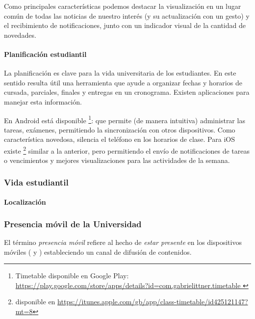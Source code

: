 Como principales características podemos destacar la visualización en un lugar común de todas las noticias de nuestro interés (y su actualización con un gesto) y el recibimiento de notificaciones, junto con un indicador visual de la cantidad de novedades.

\paragraph{Planificación estudiantil}

La planificación es clave para la vida universitaria de los estudiantes. En este sentido resulta útil una herramienta que ayude a organizar fechas y horarios
de cursada, parciales, finales y entregas en un cronograma. Existen 
aplicaciones para manejar esta información.

En Android está disponible \footnote{Timetable disponible en Google Play: \url{https://play.google.com/store/apps/details?id=com.gabrielittner.timetable } }:
que permite (de manera intuitiva) administrar las tareas, exámenes, permitiendo la sincronización con otros dispositivos. Como característica novedosa, silencia el teléfono en los horarios de clase.
Para iOS existe 
\footnote{ disponible en \url{https://itunes.apple.com/gb/app/class-timetable/id425121147?mt=8} } similar a la anterior, pero permitiendo el envío de notificaciones de tareas o vencimientos y mejores visualizaciones para las actividades de la semana.

\subsubsection{Vida estudiantil}
\label{aplicaciones_utiles_existentes_vida}

\paragraph{Localización}
\label{aplicaciones_utiles_existentes_localizacion}

\subsubsection{Presencia móvil de la Universidad}
\label{aplicaciones_utiles_existentes_presencia}

El término \textit{presencia móvil} refiere al hecho de \textit{estar presente} en los dispositivos móviles ( y ) estableciendo un  canal de difusión de contenidos\cite{presenciaMovilDef}.

